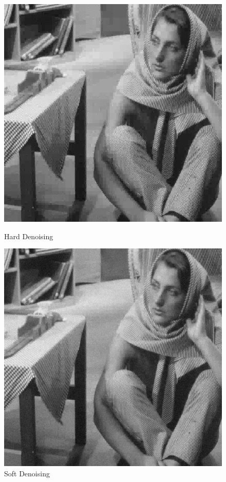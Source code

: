 \documentclass{article}
\begin{document}
    \begin{figure}[!htb]
      \includegraphics[scale=0.4]{./denoising/b/hard0_15.png}
      \caption{Hard Denoising}
    \endminipage \hfill
      \includegraphics[scale=.4]{./denoising/b/smooth0_05.png}
      \caption{Soft Denoising}
    \endminipage
    \end{figure}
    \pagebreak
\end{document}
